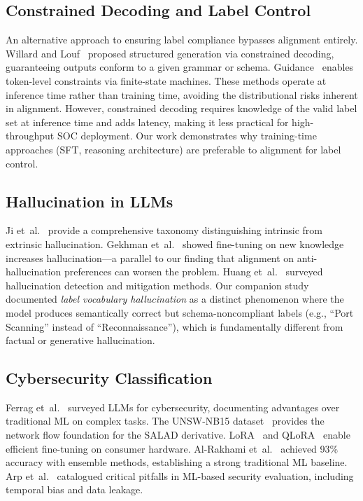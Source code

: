 \documentclass[journal]{IEEEtran}
\begin{document}
\subsection{Constrained Decoding and Label Control}
An alternative approach to ensuring label compliance bypasses alignment entirely. Willard and Louf~\cite{willard2023} proposed structured generation via constrained decoding, guaranteeing outputs conform to a given grammar or schema. Guidance~\cite{lundberg2023} enables token-level constraints via finite-state machines. These methods operate at inference time rather than training time, avoiding the distributional risks inherent in alignment. However, constrained decoding requires knowledge of the valid label set at inference time and adds latency, making it less practical for high-throughput SOC deployment. Our work demonstrates why training-time approaches (SFT, reasoning architecture) are preferable to alignment for label control.

\subsection{Hallucination in LLMs}
Ji et~al.~\cite{ji2023} provide a comprehensive taxonomy distinguishing intrinsic from extrinsic hallucination. Gekhman et~al.~\cite{gekhman2024} showed fine-tuning on new knowledge increases hallucination---a parallel to our finding that alignment on anti-hallucination preferences can worsen the problem. Huang et~al.~\cite{huang2023} surveyed hallucination detection and mitigation methods. Our companion study~\cite{p3} documented \emph{label vocabulary hallucination} as a distinct phenomenon where the model produces semantically correct but schema-noncompliant labels (e.g., ``Port Scanning'' instead of ``Reconnaissance''), which is fundamentally different from factual or generative hallucination.

\subsection{Cybersecurity Classification}
Ferrag et~al.~\cite{ferrag2024} surveyed LLMs for cybersecurity, documenting advantages over traditional ML on complex tasks. The UNSW-NB15 dataset~\cite{moustafa2016} provides the network flow foundation for the SALAD derivative. LoRA~\cite{hu2022} and QLoRA~\cite{dettmers2023} enable efficient fine-tuning on consumer hardware. Al-Rakhami et~al.~\cite{alrakhami2022} achieved 93\% accuracy with ensemble methods, establishing a strong traditional ML baseline. Arp et~al.~\cite{arp2022} catalogued critical pitfalls in ML-based security evaluation, including temporal bias and data leakage.
\end{document}
